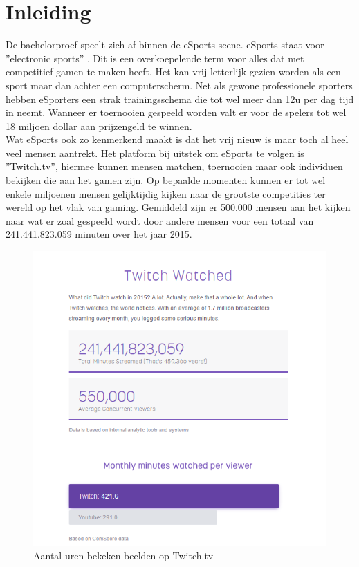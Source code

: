 \documentclass[pdftex,a4paper,12pt,twoside]{report}
\begin{document}
\tableofcontents



\chapter{Inleiding}
\label{ch:inleiding}

De bachelorproef speelt zich af binnen de eSports scene. eSports staat voor ''electronic sports'' \citep{BenDirs2015}. Dit is een overkoepelende term voor alles dat met competitief gamen te maken heeft. Het kan vrij letterlijk gezien worden als een sport maar dan achter een computerscherm. Net als gewone professionele sporters hebben eSporters een strak trainingsschema die tot wel meer dan 12u per dag tijd in neemt. Wanneer er toernooien gespeeld worden valt er voor de spelers tot wel 18 miljoen dollar aan prijzengeld te winnen. \citep{dota2theinternational} 
\\

Wat eSports ook zo kenmerkend maakt is dat het vrij nieuw is maar toch al heel veel mensen aantrekt. Het platform bij uitstek om eSports te volgen is ''Twitch.tv'', hiermee kunnen mensen matchen, toernooien maar ook individuen bekijken die aan het gamen zijn. Op bepaalde momenten kunnen er tot wel enkele miljoenen mensen gelijktijdig kijken naar de grootste competities ter wereld op het vlak van gaming. Gemiddeld zijn er 500.000 mensen aan het kijken naar wat er zoal gespeeld wordt door andere mensen voor een totaal van 241.441.823.059 minuten over het jaar 2015. \citep{twitchinfographic}
\begin{figure}[!h]
\centering
\includegraphics[width=15cm]{img/TwitchInfographic}
\caption{Aantal uren bekeken beelden op Twitch.tv}
\end{figure}  
\\
\end{document}

